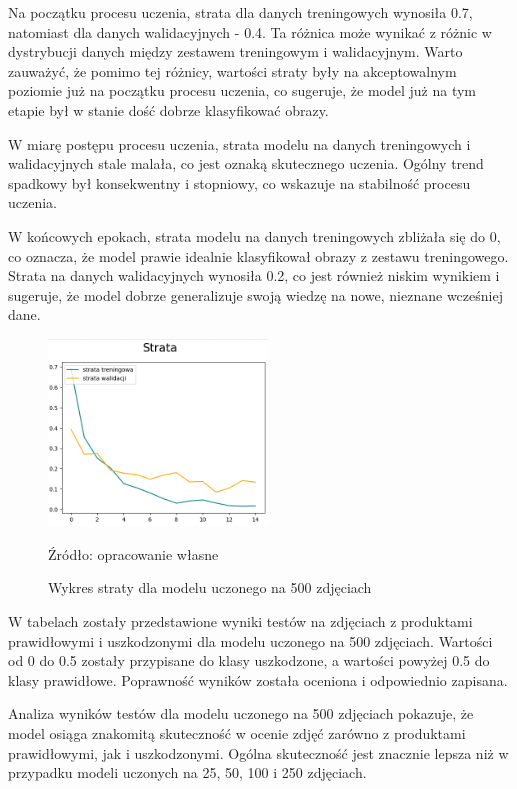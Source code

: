 Na początku procesu uczenia, strata dla danych treningowych wynosiła 0.7, natomiast dla danych walidacyjnych - 0.4. Ta różnica może wynikać z różnic w dystrybucji danych między zestawem treningowym i walidacyjnym. Warto zauważyć, że pomimo tej różnicy, wartości straty były na akceptowalnym poziomie już na początku procesu uczenia, co sugeruje, że model już na tym etapie był w stanie dość dobrze klasyfikować obrazy.

W miarę postępu procesu uczenia, strata modelu na danych treningowych i walidacyjnych stale malała, co jest oznaką skutecznego uczenia. Ogólny trend spadkowy był konsekwentny i stopniowy, co wskazuje na stabilność procesu uczenia.

W końcowych epokach, strata modelu na danych treningowych zbliżała się do 0, co oznacza, że model prawie idealnie klasyfikował obrazy z zestawu treningowego. Strata na danych walidacyjnych wynosiła 0.2, co jest również niskim wynikiem i sugeruje, że model dobrze generalizuje swoją wiedzę na nowe, nieznane wcześniej dane.

\begin{figure}[htbp]
  \centering
  \caption{Wykres straty dla modelu uczonego na 500 zdjęciach}
  \includegraphics[width=220px]{images/strata_500.png}
  \begin{center}
  \footnotesize{Źródło: opracowanie własne}
  \end{center}
  \label{fig:wykres_strata_500}
\end{figure}

W tabelach zostały przedstawione wyniki testów na zdjęciach z produktami prawidłowymi i uszkodzonymi dla modelu uczonego na 500 zdjęciach. Wartości od 0 do 0.5 zostały przypisane do klasy uszkodzone, a wartości powyżej 0.5 do klasy prawidłowe. Poprawność wyników została oceniona i odpowiednio zapisana.

Analiza wyników testów dla modelu uczonego na 500 zdjęciach pokazuje, że model osiąga znakomitą skuteczność w ocenie zdjęć zarówno z produktami prawidłowymi, jak i uszkodzonymi. Ogólna skuteczność jest znacznie lepsza niż w przypadku modeli uczonych na 25, 50, 100 i 250 zdjęciach.

